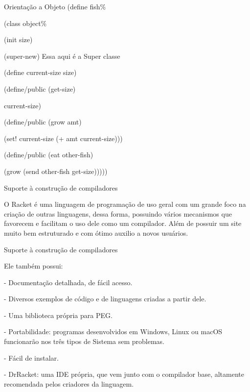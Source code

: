 \documentclass{beamer}
\begin{document}
\begin{frame}{Orientação a Objeto}
(define fish\%

  (class object\%
  
    (init size) 
    
    (super-new) Essa aqui é a Super classe
    
    (define current-size size)
    
    (define/public (get-size)
    
      current-size)
      
    (define/public (grow amt)
    
      (set! current-size (+ amt current-size)))
      
    (define/public (eat other-fish)
    
      (grow (send other-fish get-size)))))


\end{frame}


\begin{frame}[fragile]{Suporte à construção de compiladores}

O Racket é uma linguagem de programação de uso geral com um grande foco na criação de outras linguagens, dessa forma, possuindo vários mecanismos que favorecem e facilitam o uso dele como um compilador. 
Além de possuir um site muito bem estruturado e com ótimo auxilio a novos usuários.

\end{frame}


\begin{frame}[fragile]{Suporte à construção de compiladores}

Ele também possui:
 
- Documentação detalhada, de fácil acesso.

- Diversos exemplos de código e de linguagens criadas a partir dele.

- Uma biblioteca própria para PEG.

- Portabilidade: programas desenvolvidos em Windows, Linux ou macOS funcionarão nos três tipos de Sistema sem problemas.

- Fácil de instalar.

- DrRacket: uma IDE própria, que vem junto com o compilador base, altamente recomendada pelos criadores da linguagem.


\end{frame}
\end{document}
